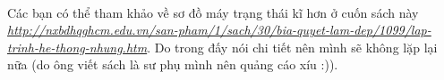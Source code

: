 \documentclass[12pt,a5paper]{book}
\begin{document}
\paragraph{}
Các bạn có thể tham khảo về sơ đồ máy trạng thái kĩ hơn ở cuốn sách này \textit{\url{http://nxbdhqghcm.edu.vn/san-pham/1/sach/30/bia-quyet-lam-dep/1099/lap-trinh-he-thong-nhung.htm}}. Do trong đấy nói chi tiết nên mình sẽ không lặp lại nữa (do ông viết sách là sư phụ mình nên quảng cáo xíu :)).

\end{document}
